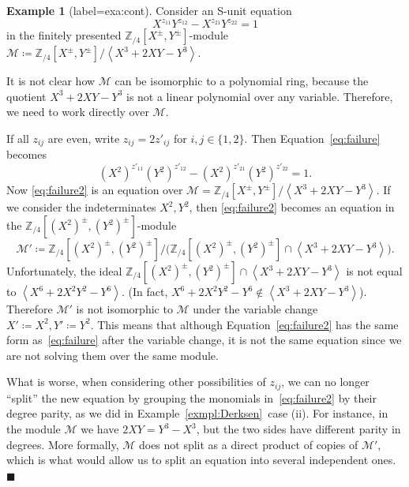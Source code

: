 \documentclass[letterpaper, 11pt, thm-restate]{article}
\numberwithin{equation}{section}
\newcommand{\Z}{\mathbb{Z}}
\newcommand{\mM}{\mathcal{M}}
\newcommand{\red}{\textcolor{red}}
\newcommand{\gen}[1]{\left\langle {#1} \right\rangle}
\theoremstyle{definition}
\theoremstyle{definition}
\newtheorem{exmpl}[thrm]{Example}
\theoremstyle{definition}
\begin{document}
\begin{exmpl}[label=exa:cont]\label{exmpl:failure}
    Consider an S-unit equation 
    \begin{equation}\label{eq:failure}
        X^{z_{11}}Y^{z_{12}} - X^{z_{21}}Y^{z_{22}} = 1
    \end{equation}
    in the finitely presented $\Z_{/4}[X^{\pm}, Y^{\pm}]$-module
    $
    \mM \coloneqq \Z_{/4}[X^{\pm}, Y^{\pm}]/\gen{X^3 + 2XY - Y^3}.
    $
    
    It is not clear how $\mM$ can be isomorphic to a polynomial ring, because the quotient $X^3 + 2XY - Y^3$ is not a linear polynomial over any variable. %
    Therefore, we need to work directly over $\mM$.
    
    If all $z_{ij}$ are even, write $z_{ij} = 2 z'_{ij}$ for $i, j \in \{1, 2\}$.
    Then Equation~\eqref{eq:failure} becomes
    \begin{equation}\label{eq:failure2}
    (X^2)^{z'_{11}} (Y^2)^{z'_{12}} - (X^2)^{z'_{21}}(Y^2)^{z'_{22}} = 1.
    \end{equation}
    Now \eqref{eq:failure2} is an equation over $\mM = \Z_{/4}[X^{\pm}, Y^{\pm}]/\gen{X^3 + 2XY - Y^3}$.
    If we consider the indeterminates $X^2, Y^2$, then \eqref{eq:failure2} becomes an equation in the $\Z_{/4}[(X^2)^{\pm}, (Y^2)^{\pm}]$-module
    \[
    \mM' \coloneqq \Z_{/4}[(X^2)^{\pm}, (Y^2)^{\pm}]\Big/\big(\Z_{/4}[(X^2)^{\pm}, (Y^2)^{\pm}] \cap \gen{X^3 + 2XY - Y^3}\big).
    \]
    Unfortunately, the ideal $\Z_{/4}[(X^2)^{\pm}, (Y^2)^{\pm}] \cap \gen{X^3 + 2XY - Y^3}$ is not equal to $\gen{X^6 + 2X^2Y^2 - Y^6}$. (In fact, $X^6 + 2X^2Y^2 - Y^6 \notin \gen{X^3 + 2XY - Y^3}$).
    Therefore $\mM'$ is not isomorphic to $\mM$ under the variable change $X' \coloneqq X^2, Y' \coloneqq Y^2$.
    This means that although Equation~\eqref{eq:failure2} has the same form as~\eqref{eq:failure} after the variable change, it is not the same equation since we are not solving them over the same module.

    What is worse, when considering other possibilities of $z_{ij}$, we can no longer ``split'' the new equation by grouping the monomials in~\eqref{eq:failure2} by their degree parity, as we did in Example~\ref{exmpl:Derksen}~case (ii).
    For instance, in the module $\mM$ we have $2XY = Y^3 - X^3$, but the two sides have different parity in degrees.
    More formally, $\mM$ does not split as a direct product of copies of $\mM'$, which is what would allow us to split an equation into several independent ones.
    \hfill $\blacksquare$
\end{exmpl}
\end{document}
